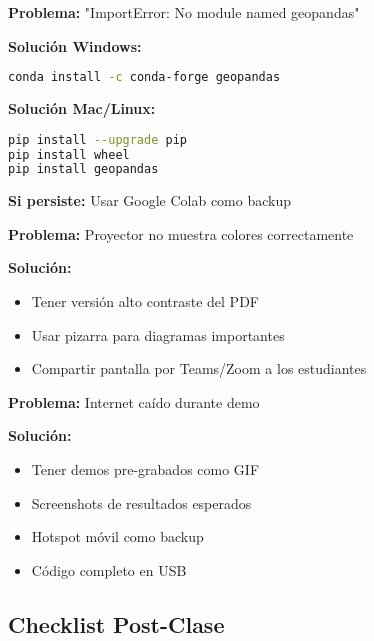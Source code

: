 \documentclass[11pt,a4paper]{article}
\begin{document}
\begin{mdframed}[backgroundcolor=red!5]
\textbf{Problema:} "ImportError: No module named geopandas"

\textbf{Solución Windows:}
\begin{lstlisting}[language=bash]
conda install -c conda-forge geopandas
\end{lstlisting}

\textbf{Solución Mac/Linux:}
\begin{lstlisting}[language=bash]
pip install --upgrade pip
pip install wheel
pip install geopandas
\end{lstlisting}

\textbf{Si persiste:} Usar Google Colab como backup
\end{mdframed}

\begin{mdframed}[backgroundcolor=red!5]
\textbf{Problema:} Proyector no muestra colores correctamente

\textbf{Solución:}
\begin{itemize}
    \item Tener versión alto contraste del PDF
    \item Usar pizarra para diagramas importantes
    \item Compartir pantalla por Teams/Zoom a los estudiantes
\end{itemize}
\end{mdframed}

\begin{mdframed}[backgroundcolor=red!5]
\textbf{Problema:} Internet caído durante demo

\textbf{Solución:}
\begin{itemize}
    \item Tener demos pre-grabados como GIF
    \item Screenshots de resultados esperados
    \item Hotspot móvil como backup
    \item Código completo en USB
\end{itemize}
\end{mdframed}

\subsection{Checklist Post-Clase}
\end{document}
